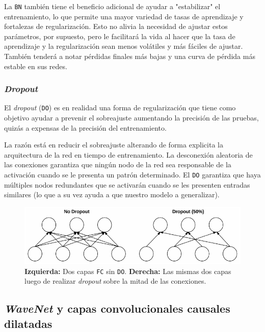 \documentclass[a4paper,12pt]{article}
\begin{document}
La \texttt{BN} también tiene el beneficio adicional de ayudar a "estabilizar" el entrenamiento, lo que permite una mayor variedad de tasas de aprendizaje y fortalezas de regularización. Esto no alivia la necesidad de ajustar estos parámetros, por supuesto, pero le facilitará la vida al hacer que la tasa de aprendizaje y la regularización sean menos volátiles y más fáciles de ajustar. También tenderá a notar pérdidas finales más bajas y una curva de pérdida más estable en sus redes.

\subsubsection{\textit{Dropout}}
El \textit{dropout} (\texttt{DO}) es en realidad una forma de regularización que tiene como objetivo ayudar a prevenir el sobreajuste aumentando la precisión de las pruebas, quizás a expensas de la precisión del entrenamiento. \citep{rosebrock2017deep}

La razón está en reducir el sobreajuste alterando de forma explicita la arquitectura de la red en tiempo de entrenamiento. La desconexión aleatoria de las conexiones garantiza que ningún nodo de la red sea responsable de la activación cuando se le presenta un patrón determinado. El \texttt{DO} garantiza que haya múltiples nodos redundantes que se activarán cuando se les presenten entradas similares (lo que a su vez ayuda a que nuestro modelo a generalizar).

\begin{figure}[H]
	\begin{center}				
	\includegraphics[width=1\textwidth]{tesis_46.png}
  	\caption{\textbf{Izquierda:} Dos capas \texttt{FC} sin \texttt{DO}. \textbf{Derecha:} Las mismas dos capas luego de realizar \textit{dropout} sobre la mitad de las conexiones.}
  	\label{fig:type-pooling}
  	\end{center}
\end{figure}

\subsection{\textit{WaveNet} y capas convolucionales causales dilatadas}
\end{document}
